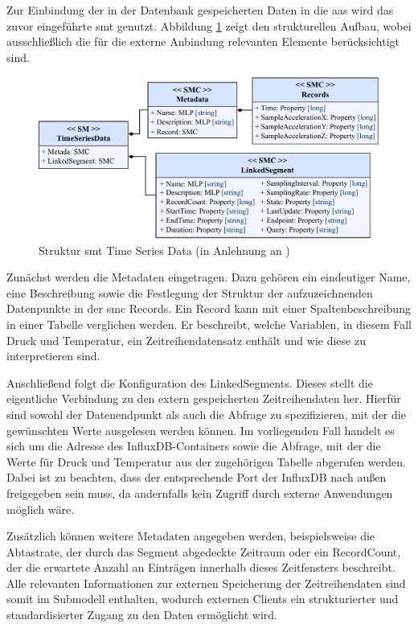 Zur Einbindung der in der Datenbank gespeicherten Daten in die \acs{aas} wird das zuvor eingeführte \acs{smt} genutzt.
Abbildung \ref{fig:SMTTimeSeriesData} zeigt den strukturellen Aufbau, wobei ausschließlich die für die externe Anbindung relevanten Elemente berücksichtigt sind.

\begin{figure}[htbp]
    \centering
    \includegraphics[width=1\textwidth]{Bilder/TimeSeries/TimeSeriesData.pdf}
    \caption[Struktur \acs{smt} Time Series Data]{Struktur \acs{smt} Time Series Data (in Anlehnung an \cite{SpezifikationTimeSeriesData})}
    \label{fig:SMTTimeSeriesData}
\end{figure}

Zunächst werden die Metadaten eingetragen. 
Dazu gehören ein eindeutiger Name, eine Beschreibung sowie die Festlegung der Struktur der aufzuzeichnenden Datenpunkte in der \acs{smc} Records.
Ein Record kann mit einer Spaltenbeschreibung in einer Tabelle verglichen werden.
Er beschreibt, welche Variablen, in diesem Fall Druck und Temperatur, ein Zeitreihendatensatz enthält und wie diese zu interpretieren sind.

Anschließend folgt die Konfiguration des LinkedSegments.
Dieses stellt die eigentliche Verbindung zu den extern gespeicherten Zeitreihendaten her. 
Hierfür sind sowohl der Datenendpunkt als auch die Abfrage zu spezifizieren, mit der die gewünschten Werte ausgelesen werden können. 
Im vorliegenden Fall handelt es sich um die Adresse des InfluxDB-Containers sowie die Abfrage, mit der die Werte für Druck und Temperatur aus der zugehörigen Tabelle abgerufen werden. 
Dabei ist zu beachten, dass der entsprechende Port der InfluxDB nach außen freigegeben sein muss, da andernfalls kein Zugriff durch externe Anwendungen möglich wäre.

Zusätzlich können weitere Metadaten angegeben werden, beispielsweise die Abtastrate, der durch das Segment abgedeckte Zeitraum oder ein RecordCount, der die erwartete Anzahl an Einträgen innerhalb dieses Zeitfensters beschreibt.
Alle relevanten Informationen zur externen Speicherung der Zeitreihendaten sind somit im Submodell enthalten, wodurch externen Clients ein strukturierter und standardisierter Zugang zu den Daten ermöglicht wird.

